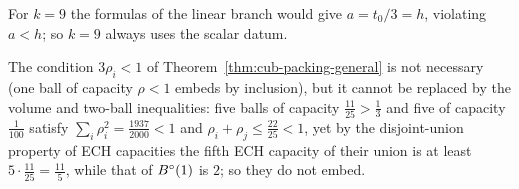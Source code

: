 For $k=9$ the formulas of the linear branch would give $a=t_0/3=h$, violating $a<h$; so $k=9$ always uses the
scalar datum.

\begin{remark}[Obstructions]\label{rem:cub-obstructions}
The condition $3\rho_i<1$ of Theorem~\ref{thm:cub-packing-general} is not necessary (one ball of capacity $\rho<1$ embeds by
inclusion), but it cannot be replaced by the volume and two-ball inequalities: five balls of capacity
$\frac{11}{25}>\frac13$ and five of capacity $\frac1{100}$ satisfy $\sum_i\rho_i^2=\frac{1937}{2000}<1$ and
$\rho_i+\rho_j\le\frac{22}{25}<1$, yet by the disjoint-union property of ECH capacities \cite{Hutchings2011} the fifth ECH
capacity of their union is at least $5\cdot\frac{11}{25}=\frac{11}5$, while that of $B^{\circ}(1)$ is $2$; so they do not embed.
\end{remark}
